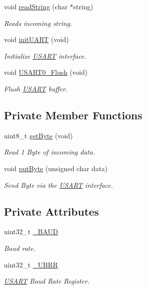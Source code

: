 \begin{DoxyCompactItemize}
void \hyperlink{classUSART_af016ea3df95f00dd664edb0b8c57787d}{read\+String} (char $\ast$string)
\begin{DoxyCompactList}\small\item\em Reads incoming string. \end{DoxyCompactList}\item 
void \hyperlink{classUSART_a5f8bbc3788153e13d94ece254f8ee2e7}{init\+U\+A\+RT} (void)
\begin{DoxyCompactList}\small\item\em Initialize \hyperlink{classUSART}{U\+S\+A\+RT} interface. \end{DoxyCompactList}\item 
void \hyperlink{classUSART_abad4151d072782e70255f999a1451199}{U\+S\+A\+R\+T0\+\_\+\+Flush} (void)
\begin{DoxyCompactList}\small\item\em Flush \hyperlink{classUSART}{U\+S\+A\+RT} buffer. \end{DoxyCompactList}\end{DoxyCompactItemize}
\subsection*{Private Member Functions}
\begin{DoxyCompactItemize}
\item 
uint8\+\_\+t \hyperlink{classUSART_a42a1789b9a8805da6ed3f4f62f74a764}{get\+Byte} (void)
\begin{DoxyCompactList}\small\item\em Read 1 Byte of incoming data. \end{DoxyCompactList}\item 
void \hyperlink{classUSART_a0103c87dca8c49a1fa9ec607d4d494a9}{put\+Byte} (unsigned char data)
\begin{DoxyCompactList}\small\item\em Send Byte via the \hyperlink{classUSART}{U\+S\+A\+RT} interface. \end{DoxyCompactList}\end{DoxyCompactItemize}
\subsection*{Private Attributes}
\begin{DoxyCompactItemize}
\item 
uint32\+\_\+t \hyperlink{classUSART_adb222c3be48f5a559ed2dd9b4743edda}{\+\_\+\+B\+A\+UD}
\begin{DoxyCompactList}\small\item\em Baud rate. \end{DoxyCompactList}\item 
uint32\+\_\+t \hyperlink{classUSART_acbd19517b595cf04ff087e040270904f}{\+\_\+\+U\+B\+RR}
\begin{DoxyCompactList}\small\item\em \hyperlink{classUSART}{U\+S\+A\+RT} Baud Rate Register. \end{DoxyCompactList}\end{DoxyCompactItemize}


